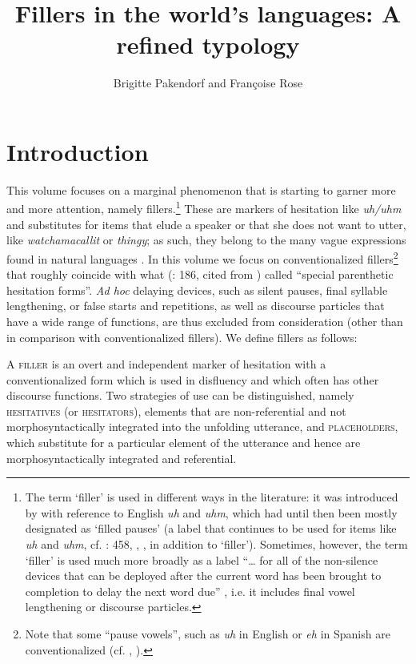 \documentclass[output=paper]{langscibook}
\author{Brigitte Pakendorf\orcid{}\affiliation{Laboratoire Dynamique du Langage (CNRS \& Université Lumière Lyon 2)} and Françoise Rose\orcid{}\affiliation{Laboratoire Dynamique du Langage (CNRS \& Université Lumière Lyon 2)}}
\title{Fillers in the world’s languages: A refined typology}
\begin{document}
\maketitle 

\section{Introduction}\label{sec:intro:1}
\largerpage

This volume focuses on a marginal phenomenon that is starting to garner more and more attention, namely fillers.\footnote{The term ‘filler’ is used in different ways in the literature: it was introduced by \citet[75]{Clark2002} with reference to English \textit{uh} and \textit{uhm}, which had until then been mostly designated as ‘filled pauses’ (a label that continues to be used for items like \textit{uh} and \textit{uhm}, cf. \citealt{Lickley2015}: 458, \citealt{KosmalaCrible2022}, \citealt{Kirjavainen2022}, in addition to ‘filler’). Sometimes, however, the term ‘filler’ is used much more broadly as a label “… for all of the non-silence devices that can be deployed after the current word has been brought to completion to delay the next word due” \citep[2]{Fox2010}, i.e. it includes final vowel lengthening or discourse particles.} These are markers of hesitation like \textit{uh/uhm} and substitutes for items that elude a speaker or that she does not want to utter, like \textit{watchamacallit} or \textit{thingy}; as such, they belong to the many vague expressions found in natural languages \citep{Cutting2007}. In this volume we focus on conventionalized fillers\footnote{Note that some “pause vowels”, such as \textit{uh} in English or \textit{eh} in Spanish are conventionalized (cf. \citealt{Clark2002}, \citealt{Erker2022}).} that roughly coincide with what \citeauthor{Bloomfield1933} (\citeyear{Bloomfield1933}: 186, cited from \citealt[21]{Maclay1959}) called “special parenthetic hesitation forms”. \textit{Ad hoc} delaying devices, such as silent pauses, final syllable lengthening, or false starts and repetitions, as well as discourse particles that have a wide range of functions, are thus excluded from consideration (other than in comparison with conventionalized fillers). We define fillers as follows: 

\begin{exe}
 A \textsc{filler} is an overt and independent marker of hesitation with a conventionalized form which is used in disfluency and which often has other discourse functions. Two strategies of use can be distinguished, namely \textsc{hesitatives} (or \textsc{hesitators}), elements that are non-referential and not morphosyntactically integrated into the unfolding utterance, and \textsc{placeholders}, which substitute for a particular element of the utterance and hence are morphosyntactically integrated and referential.
\end{exe}
\end{document}
